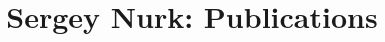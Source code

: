 \documentclass[11pt]{article}
\begin{document}
\title{Sergey Nurk: Publications}
\date{}
\maketitle


\end{document}
